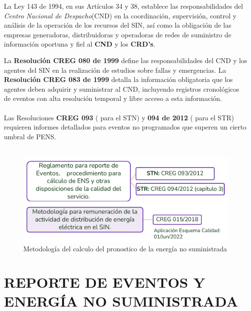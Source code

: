 \documentclass[a5paper]{book}%
\begin{document}
\begin{center}
\begin{tcolorbox}
  La Ley 143 de 1994, en sus Artículos 34 y 38, establece las responsabilidades del \textit{Centro Nacional de Despacho}(CND) en la coordinación, supervisión, control y análisis de la operación de los recursos del SIN, así como la obligación de las empresas generadoras, distribuidoras y operadoras de redes de suministro de información oportuna y fiel al \textbf{CND} y los \textbf{CRD's}.
\end{tcolorbox}
\end{center}

La \textbf{Resolución CREG 080 de 1999} define las responsabilidades del CND y los agentes del SIN en la realización de estudios sobre fallas y emergencias. La \textbf{Resolución CREG 083 de 1999} detalla la información obligatoria que los agentes deben adquirir y suministrar al CND, incluyendo registros cronológicos de eventos con alta resolución temporal y libre acceso a esta información.\\\\ 
  
Las Resoluciones \textbf{CREG 093} ( para el \ac{STN}) y \textbf{094 de 2012} ( para el STR) requieren informes detallados para eventos no programados que superen un cierto umbral de \ac{PENS}.\\\\

\begin{figure}[H]
   \centering
   \caption{Metodología del calculo del pronostico de la energía no suministrada}
   \label{fig:ens}
   \includegraphics[width=\linewidth]{calculo_ens.png}
 \end{figure}

\section{REPORTE DE EVENTOS Y ENERGÍA NO SUMINISTRADA}
\end{document}
